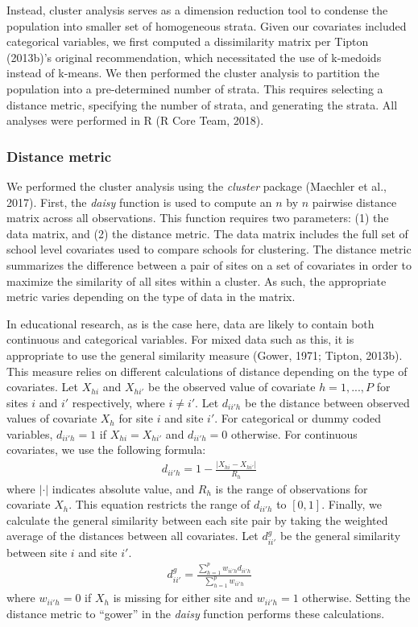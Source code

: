 \documentclass[english,man,floatsintext]{apa6}
\begin{document}
Instead, cluster analysis serves as a dimension reduction tool to condense the population into smaller set of homogeneous strata. Given our covariates included categorical variables, we first computed a dissimilarity matrix per Tipton (2013b)'s original recommendation, which necessitated the use of k-medoids instead of k-means. We then performed the cluster analysis to partition the population into a pre-determined number of strata. This requires selecting a distance metric, specifying the number of strata, and generating the strata. All analyses were performed in R (R Core Team, 2018).

\hypertarget{distance-metric}{%
\subsubsection{Distance metric}\label{distance-metric}}

We performed the cluster analysis using the \emph{cluster} package (Maechler et al., 2017). First, the \emph{daisy} function is used to compute an \(n\) by \(n\) pairwise distance matrix across all observations. This function requires two parameters: (1) the data matrix, and (2) the distance metric. The data matrix includes the full set of school level covariates used to compare schools for clustering. The distance metric summarizes the difference between a pair of sites on a set of covariates in order to maximize the similarity of all sites within a cluster. As such, the appropriate metric varies depending on the type of data in the matrix.

In educational research, as is the case here, data are likely to contain both continuous and categorical variables. For mixed data such as this, it is appropriate to use the general similarity measure (Gower, 1971; Tipton, 2013b). This measure relies on different calculations of distance depending on the type of covariates. Let \(X_{hi}\) and \(X_{hi'}\) be the observed value of covariate \(h = {1, ..., P}\) for sites \(i\) and \(i'\) respectively, where \(i \ne i'\). Let \(d_{ii'h}\) be the distance between observed values of covariate \(X_{h}\) for site \(i\) and site \(i'\). For categorical or dummy coded variables, \(d_{ii'h} = 1\) if \(X_{hi} = X_{hi'}\) and \(d_{ii'h} = 0\) otherwise. For continuous covariates, we use the following formula:
\begin{align}
d_{ii'h} = 1 - \frac{|X_{hi} - X_{hi'}|}{R_h}
\end{align}
where \(|\cdot|\) indicates absolute value, and \(R_h\) is the range of observations for covariate \(X_h\). This equation restricts the range of \(d_{ii'h}\) to \([0,1]\). Finally, we calculate the general similarity between each site pair by taking the weighted average of the distances between all covariates. Let \(d^{g}_{ii'}\) be the general similarity between site \(i\) and site \(i'\).
\begin{align}
d^{g}_{ii'} = \frac{\sum^p_{h = 1}w_{ii'h}d_{ii'h}}{\sum^p_{h = 1}w_{ii'h}}
\end{align}
where \(w_{ii'h} = 0\) if \(X_h\) is missing for either site and \(w_{ii'h} = 1\) otherwise. Setting the distance metric to \enquote{gower} in the \emph{daisy} function performs these calculations.
\end{document}
